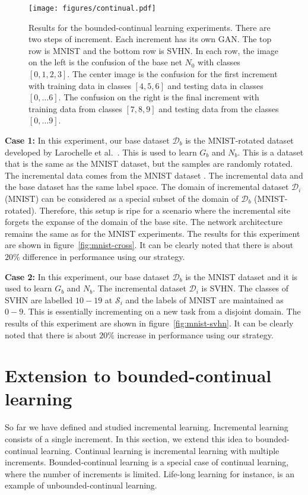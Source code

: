 \documentclass[10pt,twocolumn,letterpaper]{article}
\def \cS{{\mathcal{S}}}
\def \cD{{\mathcal{D}}}
\begin{document}
	
	\begin{figure*}[t]
		\begin{center}
			\texttt{[image: figures/continual.pdf]}		
		\end{center}
		
		\caption{Results for the bounded-continual learning experiments. There are two steps of increment. Each increment has its own GAN. The top row is MNIST and the bottom row is SVHN. In each row, the image on the left is the confusion of the base net $N_0$ with classes $[0,1,2,3]$. The center image is the confusion for the first increment with training data in classes $[4,5,6]$ and testing data in classes $[0, \dots 6]$. The confusion on the right is the final increment with training data from classes $[7,8,9]$ and testing data from the classes $[0, \dots 9]$.}
		
		\label{fig:continual}
	\end{figure*}
	\noindent\textbf{Case 1:}
	In this experiment, our base dataset $\cD_b$ is the MNIST-rotated dataset developed by Larochelle et al.~\cite{larochelle2007empirical}.
	This is used to learn $G_b$ and $N_b$.
	This is a dataset that is the same as the MNIST dataset, but the samples are randomly rotated.
	The incremental data comes from the MNIST dataset .
	The incremental data and the base dataset has the same label space.
	The domain of incremental dataset $\cD_i$ (MNIST) can be considered as a special subset of the domain of $\cD_b$ (MNIST-rotated). 
	Therefore, this setup is ripe for a scenario where the incremental site forgets the expanse of the domain of the base site. 
	The network architecture remains the same as for the MNIST experiments.
	The results for this experiment are shown in figure~\ref{fig:mnist-cross}.
	It can be clearly noted that there is about $20\%$ difference in performance using our strategy.
	
	\noindent\textbf{Case 2:}
	In this experiment, our base dataset $\cD_b$ is the MNIST dataset and it is used to learn $G_b$ and $N_b$.
	The incremental dataset $\cD_i$ is SVHN. 
	The classes of SVHN are labelled $10 - 19$ at $\cS_i$ and the labels of MNIST are maintained as $0-9$.
	This is essentially incrementing on a new task from a disjoint domain.
	The results of this experiment are shown in figure~\ref{fig:mnist-svhn}.
	It can be clearly noted that there is about $20\%$ increase in performance using our strategy.
	
	\section{Extension to bounded-continual learning}
	So far we have defined and studied incremental learning. 
	Incremental learning consists of a single increment. 
	In this section, we extend this idea to bounded-continual learning.
	Continual learning is incremental learning with multiple increments. 
	Bounded-continual learning is a special case of continual learning, where the number of increments is limited. 
	Life-long learning for instance, is an example of unbounded-continual learning. 
	
\end{document}
